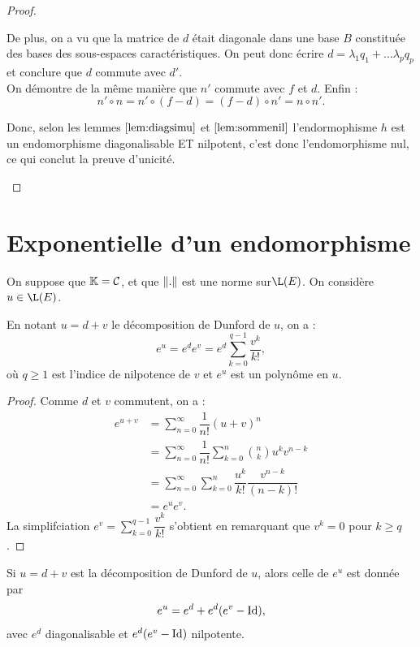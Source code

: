 \begin{proof}
\begin{enumerate}
De plus, on a vu que la matrice de $d$ était diagonale dans une base $B$ constituée des bases des sous-espaces caractéristiques.
On peut donc écrire $d = \lambda_1 q_1 + \dots \lambda_p q_p$ et conclure que $d$ commute avec $d'$. \\

On démontre de la même manière que $n'$ commute avec $f$ et $d$. Enfin :
\[ n' \circ n = n' \circ (f-d) = (f-d) \circ n' = n \circ n' . \]

Donc, selon les lemmes $\ref{lem:diagsimu}$ et $\ref{lem:sommenil}$ l'endormophisme $h$ est un endomorphisme diagonalisable ET
nilpotent, c'est donc l'endomorphisme nul, ce qui conclut la preuve d'unicité.
\end{enumerate}

\end{proof}

\section{Exponentielle d'un endomorphisme}

On suppose que $\mathbb{K} = \mathcal{C}$, et que $\lVert.\rVert$ est une norme sur$\L(E)$. On considère $u \in \L(E)$.

\begin{lem}
En notant $u = d+v$ le décomposition de Dunford de $u$, on a :
\[ e^u = e^d e^v =e^d \sum_{k=0}^{q-1} \dfrac{v^k}{k!} , \]
où $q \geq 1$ est l'indice de nilpotence de $v$ et $e^u$ est un polynôme en $u$.
\end{lem}

\begin{proof}
Comme $d$ et $v$ commutent, on a :
\begin{align*}
e^{u+v} & = \sum_{n=0}^{\infty} \dfrac1{n!} (u+v)^n \\
& = \sum_{n=0}^{\infty} \dfrac1{n!} \sum_{k=0}^n \binom{n}{k} u^k v^{n-k} \\
& = \sum_{n=0}^{\infty} \sum_{k=0}^n \dfrac{u^k}{k!} \dfrac{v^{n-k}}{(n-k)!} \\
& = e^u e^v .
\end{align*}
La simplifciation $e^v =  \sum_{k=0}^{q-1} \dfrac{v^k}{k!}$ s'obtient en remarquant que $v^k = 0$ pour $k \geq q$.
\end{proof} 

\begin{thm}
Si $u=d+v$ est la décomposition de Dunford de $u$, alors celle de $e^u$ est donnée par 
\[ e^u = e^d +e^d(e^v-\operatorname{Id}), \]
avec $e^d$ diagonalisable et $e^d(e^v-\operatorname{Id})$ nilpotente.
\end{thm}

